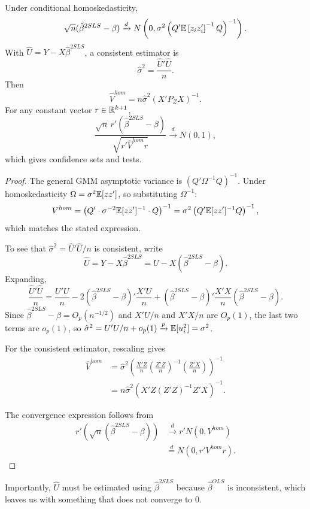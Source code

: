 \begin{proposition}
	Under conditional homoskedasticity, \[
		\sqrt{n}(\hat{\beta}^{2SLS}-\beta) \xrightarrow{d} N\left(0, \sigma^2\left(Q'\mathbb{E}\left[z_i z_i'\right]^{-1}Q\right)^{-1}\right)
	.\]
	With $\hat{U}=Y-X\hat{\beta}^{2SLS}$, a consistent estimator is \[
		\hat{\sigma}^2 = \frac{\hat{U}'\hat{U}}{n}
	.\]
	Then \[
		\hat{V}^{hom} = n\hat{\sigma}^2(X'P_ZX)^{-1}
	.\]
	For any constant vector $r\in\mathbb{R}^{k+1}$, \[
		\frac{\sqrt{n}\,r'\left(\hat{\beta}^{2SLS}-\beta\right)}{\sqrt{r'\hat{V}^{hom}r}} \xrightarrow{d} N(0,1)
	,\]
	which gives confidence sets and tests.
\end{proposition}
\begin{proof}
	The general GMM asymptotic variance is $(Q'\Omega^{-1}Q)^{-1}$.
	Under homoskedasticity $\Omega = \sigma^2\mathbb{E}[zz']$, so substituting $\Omega^{-1}$:
	\[
		V^{hom} = \left(Q'\cdot\sigma^{-2}\mathbb{E}[zz']^{-1}\cdot Q\right)^{-1} = \sigma^2\left(Q'\mathbb{E}[zz']^{-1}Q\right)^{-1}
	,\]
	which matches the stated expression.

	To see that $\hat{\sigma}^2=\hat{U}'\hat{U}/n$ is consistent, write
	\[\hat{U}=Y-X\hat{\beta}^{2SLS}=U-X(\hat{\beta}^{2SLS}-\beta).\]
	Expanding,
	\[
		\frac{\hat{U}'\hat{U}}{n}
		= \frac{U'U}{n}
		-2(\hat{\beta}^{2SLS}-\beta)'\frac{X'U}{n}
		+(\hat{\beta}^{2SLS}-\beta)'\frac{X'X}{n}(\hat{\beta}^{2SLS}-\beta)
	.\]
	Since $\hat{\beta}^{2SLS}-\beta=O_p(n^{-1/2})$ and $X'U/n$ and $X'X/n$ are $O_p(1)$, the last two terms are $o_p(1)$, so $\hat{\sigma}^2=U'U/n+o_p(1)\xrightarrow{p}\mathbb{E}[u_i^2]=\sigma^2$.

	For the consistent estimator, rescaling gives
	\begin{align*}
		\hat{V}^{hom} &= \hat{\sigma}^2 \left( \frac{X'Z}{n}\left( \frac{Z'Z}{n} \right)^{-1} \left( \frac{Z'X}{n} \right) \right)^{-1}\\
		&= n\hat{\sigma}^2 \left( X'Z \left( Z'Z \right)^{-1}Z'X \right)^{-1}
	.\end{align*}
	
	The convergence expression follows from
	\begin{align*}
		r' \left( \sqrt{n} \left( \hat{\beta}^{2SLS} - \beta \right) \right)
		&\xrightarrow{d} r' N\left( 0, V^{hom} \right)\\
		&\overset{d}{=} N\left( 0, r' V^{hom}r \right)
	.\end{align*}
\end{proof}

Importantly, $\hat{U}$ must be estimated using $\hat{\beta}^{2SLS}$ because $\hat{\beta}^{OLS}$ is inconsistent, which leaves us with something that does not converge to $0$. 

